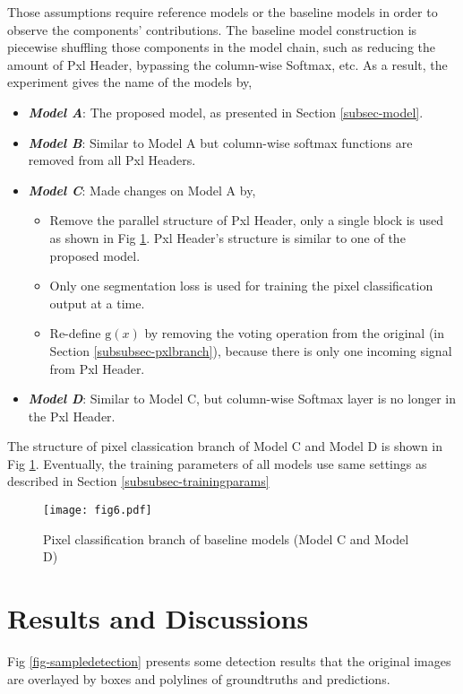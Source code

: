 \documentclass[default,pdflatex,iicol]{sn-jnl}%
\begin{document}
Those assumptions require reference models or the baseline models in order to observe the components' contributions. The baseline model construction is piecewise shuffling those components in the model chain, such as reducing the amount of Pxl Header, bypassing the column-wise Softmax, etc. As a result, the experiment gives the name of the models by,
\begin{itemize} 
\item[] \emph{\textbf{Model A}}: The proposed model, as presented in Section \ref{subsec-model}. \\
\item[] \emph{\textbf{Model B}}: Similar to Model A but column-wise softmax functions are removed from all Pxl Headers. \\
\item[] \emph{\textbf{Model C}}: Made changes on Model A by,
	\begin{itemize}
  	\item Remove the parallel structure of Pxl Header, only a single block is used as shown in Fig \ref{fig6-baselinePxlHeader}. Pxl Header's structure is similar to one of the proposed model. 
  	\item Only one segmentation loss is used for training the pixel classification output at a time.
  	\item Re-define $\mathrm{g}(x)$ by removing the voting operation from the original (in Section \ref{subsubsec-pxlbranch}), because there is only one incoming signal from Pxl Header.
	\end{itemize}
\item[] \emph{\textbf{Model D}}: Similar to Model C, but column-wise Softmax layer is no longer in the Pxl Header.
\end{itemize}

The structure of pixel classication branch of Model C and Model D is shown in Fig \ref{fig6-baselinePxlHeader}. Eventually, the training parameters of all models use same settings as described in Section \ref{subsubsec-trainingparams}

\begin{figure}[h]%
\centering
\texttt{[image: fig6.pdf]}
\caption{Pixel classification branch of baseline models (Model C and Model D)}\label{fig6-baselinePxlHeader}
\end{figure}

\section{Results and Discussions}\label{sec-results}
Fig \ref{fig-sampledetection} presents some detection results that the original images are overlayed by boxes and polylines of groundtruths and predictions. 
\end{document}
